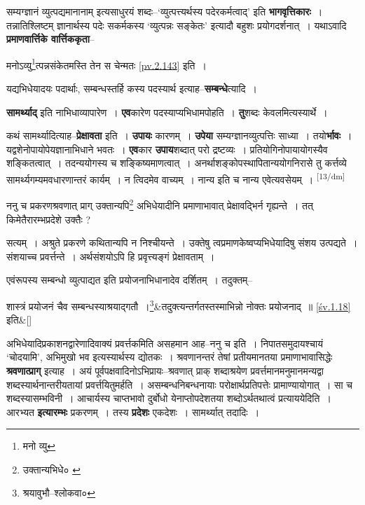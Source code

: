 \documentclass[article,12pt,a4paper]{memoir}
\begin{document}
	  \pstart सम्यग्ज्ञानं व्युत्पद्यमानानाम् इत्यसाधुरयं शब्दः--‘व्युत्पत्त्यर्थस्य पदेरकर्मत्वाद्’ इति \textbf{भागवृत्तिकारः} । तन्नातिश्लिष्टम् ज्ञानार्थस्य पदेः सकर्मकस्य ‘व्युत्पन्नः सङ्केतः’ इत्यादौ बहुशः प्रयोगदर्शनात् । यथाऽवादि \textbf{प्रमाणवार्त्तिके वार्त्तिककृता}--
	\pend
      

	  \pstart मनोऽव्यु\footnote{मनो व्यु}त्पन्नसंकेतमस्ति तेन स चेन्मतः \cref{pv.2.143} इति ।
	\pend
      

	  \pstart यद्यभिधेयादयः पदार्थाः, सम्बन्धस्तर्हि कस्य पदस्यार्थ इत्याह--\textbf{सम्बन्धे}त्यादि ।
	\pend
      

	  \pstart \textbf{सामर्थ्याद्} इति नाभिधाव्यापारेण । \textbf{एव}कारेण पदस्याप्यभिधामपोहति । \textbf{तु}शब्दः केवलमित्यस्यार्थे ।
	\pend
      

	  \pstart कथं सामर्थ्यादित्याह--\textbf{प्रेक्षावता} इति । \textbf{उपायः} कारणम् । \textbf{उपेया} सम्यग्ज्ञानव्युत्पत्तिः साध्या । तयो\textbf{र्भावः} । यद्वशेनोपायोपेयज्ञानाभिधाने भवतः । \textbf{एव}कार \textbf{उपाय}शब्दात् परो द्रष्टव्यः । प्रतियोगिनोपायायोगस्यैव शङ्कितत्वात् । तदन्ययोगस्य च शङ्किष्यमाणत्वात् । अनर्थाशङ्कोपस्थापितान्ययोगनिरासे तु कर्त्तव्ये सामर्थ्यगम्यमवधारणान्तरं कार्यम् । न त्विदमेव वाच्यम् । नान्य इति च नान्य एवेत्यवसेयम् ।
	\pend
      \leavevmode\textsuperscript{\rmlatinfont\tiny [13/dm]}

	  \pstart ननु च प्रकरणश्रवणात् प्राग् उक्तान्यपि\footnote{उक्तान्यभिधे० \cite{dp-msB}} अभिधेयादीनि प्रमाणाभावात् प्रेक्षावद्भिर्न गृह्यन्ते । तत् किमेतैरारम्भप्रदेशे उक्तैः ?
	\pend
       

	  \pstart सत्यम् । अश्रुते प्रकरणे कथितान्यपि न निश्चीयन्ते । उक्तेषु त्वप्रमाणकेष्वप्यभिधेयादिषु संशय उत्पद्यते । संशयाच्च प्रवर्त्तन्ते । अर्थसंशयोऽपि हि प्रवृत्त्यङ्गं प्रेक्षावताम् ।
	\pend
      

	  \pstart एवंरूपस्य सम्बन्धो व्युत्पाद्यत इति प्रयोजनाभिधानादेव दर्शितम् । तदुक्तम्--
	\pend
      
	    
	    \stanza[\smallbreak]
शास्त्रं प्रयोजनं चैव सम्बन्धस्याश्रयाद्गतौ ।\footnote{श्रयावुभौ--श्लोकवा०}&तदुक्त्यन्तर्गतस्तस्माभिन्नो नोक्तः प्रयोजनाद् ॥ \cref{śv.1.18} इति\&[\smallbreak]


	

	  \pstart अभिधेयादिप्रकाशनद्वारेणादिवाक्यं प्रवर्त्तकमिति असहमान आह--ननु च इति । निपातसमुदायश्चायं ‘चोदयामि’, अभिमुखो भव इत्यस्यार्थस्य द्योतकः । श्रवणानन्तरं तेषां प्रतीयमानतया प्रमाणाभावासिद्धेः \textbf{श्रवणात्प्राग्} इत्याह । अयं पूर्वपक्षवादिनोऽभिप्रायः--श्रवणात् प्राक् शब्दाश्रयेण प्रवर्त्तमानमनुमानमन्यद्वा शब्दस्यार्थनान्तरीयतायां प्रवर्त्तयितुमर्हति । असम्बन्धनिबन्धनायाः परोक्षार्थप्रतिपत्तेः प्रामाण्यायोगात् । सा च शब्दस्यासम्भविनी । आचार्यस्य चाप्तभावो दुर्बोधो येनाप्तोपदेशतया शब्दोऽर्थतथात्वं प्रत्याययेदिति । आरभ्यत \textbf{इत्यारम्भः} प्रकरणम् । तस्य \textbf{प्रदेशः} एकदेशः । सामर्थ्यात् तदादिः ।
	\pend
      
\end{document}
